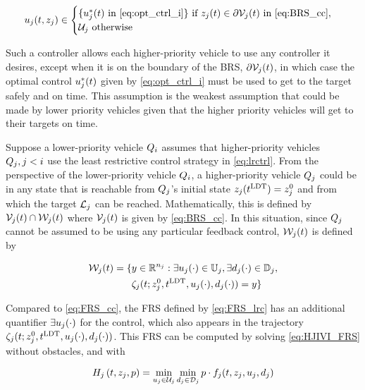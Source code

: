 \begin{equation}
\label{eq:lrctrl} %
\ctrl_j(t, \state_j)\in \begin{cases} \{\ctrl_j^*(t) \text{ in \eqref{eq:opt_ctrl_i}}\} \text{ if } \state_j(t)\in \partial \brs_j(t) \text{ in \eqref{eq:BRS_cc}}, \\
\cset_j  \text{ otherwise}
\end{cases}
\end{equation}

Such a controller allows each higher-priority vehicle to use any controller it desires, except when it is on the boundary of the BRS, $\partial \mathcal{V}_j(t)$, in which case the optimal control $u_j^*(t)$ given by \eqref{eq:opt_ctrl_i} must be used to get to the target safely and on time. This assumption is the weakest assumption that could be made by lower priority vehicles given that the higher priority vehicles will get to their targets on time.

Suppose a lower-priority vehicle $Q_{i}$ assumes that higher-priority vehicles $Q_{j}, j < i$ use the least restrictive control strategy in \eqref{eq:lrctrl}. From the perspective of the lower-priority vehicle $Q_{i}$, a higher-priority vehicle $Q_{j}$ could be in any state that is reachable from $Q_{j}$'s initial state $z_j(t^\text{LDT}) =z_j^0$ and from which the target $\mathcal{L}_j$ can be reached. Mathematically, this is defined by $\mathcal{V}_j(t) \cap \mathcal{W}_j(t)$ where $\mathcal{V}_j(t)$ is given by \eqref{eq:BRS_cc}. In this situation, since $Q_{j}$ cannot be assumed to be using any particular feedback control, $\mathcal{W}_j(t)$ is defined by

\begin{equation}
\label{eq:FRS_lrc}
\begin{aligned}
\frs_j(t) = \{&y \in \R^{n_j}:\exists \ctrl_j(\cdot) \in \cfset_j, \exists \dstb_j(\cdot) \in \dfset_j, \\
&\traj_j(t; \state^0_j, \ldt, \ctrl_j(\cdot), \dstb_j(\cdot))= y\}
\end{aligned}
\end{equation}

Compared to \eqref{eq:FRS_cc}, the FRS defined by \eqref{eq:FRS_lrc} has an additional quantifier $\exists u_j(\cdot)$ for the control, which also appears in the trajectory $\zeta_j(t; z^0_j, t^\text{LDT}, u_j(\cdot), d_j(\cdot))$. This FRS can be computed by solving \eqref{eq:HJIVI_FRS} without obstacles, and with

\begin{equation}
H_j\left(t, z_j, p\right) = \min_{u_j \in \mathcal{U}_j} \min_{d_j \in \mathcal{D}_j} p \cdot f_j(t, z_j, u_j, d_j)
\end{equation}

